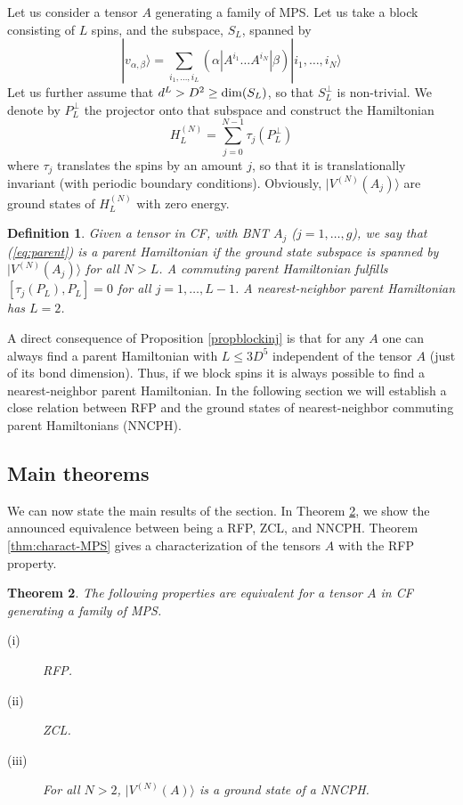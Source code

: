 \documentclass{elsarticle}
\newcommand{\be}{\begin{equation}}
\newcommand{\ee}{\end{equation}}
\newtheorem{thm}{Theorem}[section]
\newtheorem{defn}[thm]{Definition}
\begin{document}
Let us consider a tensor $A$ generating a family of MPS. Let us take a block consisting of $L$ spins, and the subspace, $S_L$, spanned by
\be
    |v_{\alpha,\beta}\rangle = \sum_{i_1,\ldots,i_L} (\alpha|A^{i_1}\ldots A^{i_N}|\beta) |i_1,\ldots,i_N\rangle
\ee
Let us further assume that $d^L>D^2\ge {\rm dim}(S_L)$, so that $S_L^\perp$ is non-trivial. We denote by $P_L^\perp$ the projector onto that subspace and construct the Hamiltonian
\be
    \label{eq:parent}
    H_{L}^{(N)} = \sum_{j=0}^{N-1} \tau_j(P_L^\perp)
\ee
where $\tau_j$ translates the spins by an amount $j$, so that it is translationally invariant (with periodic boundary conditions). Obviously, $|V^{(N)}(A_j)\rangle$ are ground states of $H_L^{(N)}$ with zero energy.

\begin{defn}
    Given a tensor in CF, with BNT $A_j$ ($j=1,\ldots,g$), we say that
    (\ref{eq:parent}) is a parent Hamiltonian if the ground state subspace is spanned by $|V^{(N)}(A_j)\rangle$ for all $N>L$.  A commuting parent Hamiltonian fulfills $[\tau_j(P_L),P_L]=0$ for all $j=1,\ldots,L-1$. A nearest-neighbor parent Hamiltonian has $L=2$.
\end{defn}

A direct consequence of Proposition \ref{propblockinj} \cite{David2006} is that for any $A$ one can always find a parent Hamiltonian with $L\le 3D^5$ independent of the tensor $A$ (just of its bond dimension). Thus, if we block spins it is always possible to find a nearest-neighbor parent Hamiltonian. In the following section we will establish a close relation between RFP and the ground states of nearest-neighbor commuting parent Hamiltonians (NNCPH).

\subsection{Main theorems}

We can now state the main results of the section. In Theorem \ref{thm:main-MPS}, we show the announced equivalence between being a RFP,  ZCL, and NNCPH. Theorem \ref{thm:charact-MPS} gives a characterization of the tensors $A$ with the RFP property.

\begin{thm}\label{thm:main-MPS}
    The following properties are equivalent for a tensor $A$ in CF generating a family of  MPS.
    \begin{description}
        \item[(i)] RFP.
        \item[(ii)] ZCL.
        \item[(iii)] For all $N>2$, $|V^{(N)} (A)\rangle$ is a ground state of a NNCPH.
    \end{description}
\end{thm}
\end{document}
